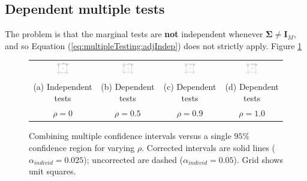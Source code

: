 \documentclass[letterpaper,12pt,oneside,final]{article}
\newcommand{\m}[1]{\mathbf{#1}}               %
\newcommand{\sm}[1]{\boldsymbol{#1}}   %
\begin{document}
\subsection{Dependent multiple tests}
The problem is that the marginal tests are {\bf not} independent whenever $\sm{\Sigma} \ne \m{I}_M$, and so Equation (\ref{eq:multipleTesting:adjIndep}) does not strictly apply.
Figure \ref{fig:multipleTesting:confIntervalsCorrectedRho}
\begin{figure}[htp]
\begin{center}
\begin{tabular}{cccc}
\includegraphics[width = 0.220\textwidth]{./img/intervalsCorrectedEllipseRho0.png} &
\includegraphics[width = 0.220\textwidth]{./img/intervalsCorrectedEllipseRho5.png} &
\includegraphics[width = 0.220\textwidth]{./img/intervalsCorrectedEllipseRho9.png} &
\includegraphics[width = 0.220\textwidth]{./img/intervalsCorrectedEllipseRho10.png} 
\\
{\footnotesize  (a) Independent tests } &  
{\footnotesize  (b) Dependent tests }&
{\footnotesize  (c) Dependent tests } &
{\footnotesize  (d) Dependent tests } 
\\
{\footnotesize $\rho = 0$ } & 
{\footnotesize $\rho = 0.5$} &
{\footnotesize $\rho = 0.9$} &
{\footnotesize $\rho = 1.0$} 
\end{tabular}
\end{center}
\caption{Combining multiple confidence intervals versus a single $95\%$confidence region for varying $\rho$.  Corrected intervals are solid lines ($\alpha_{individ} = 0.025$); uncorrected are dashed ($\alpha_{individ} = 0.05$).   Grid shows unit squares.}
\label{fig:multipleTesting:confIntervalsCorrectedRho}
 \end{figure}
\end{document}
